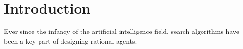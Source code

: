 \section{Introduction}

Ever since the infancy of the artificial intelligence field, search
algorithms have been a key part of designing rational agents. 